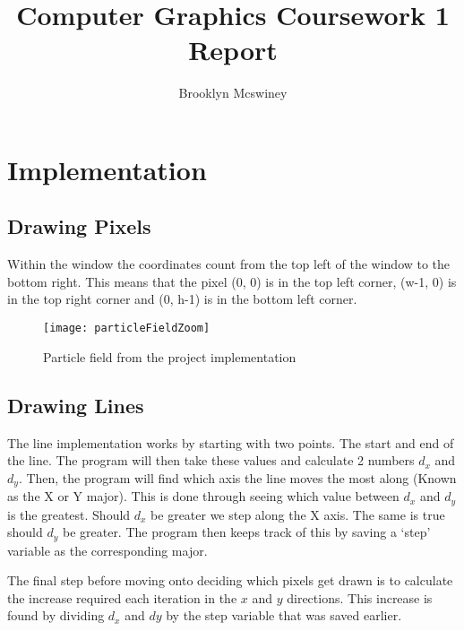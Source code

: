 \documentclass[
	letterpaper, %
	10pt, %
]{CSUniSchoolLabReport}
\title{Computer Graphics Coursework 1 Report} %
\author{Brooklyn Mcswiney} %
\date{ }
\begin{document}
\maketitle %

\noindent\makebox[\linewidth]{\rule{\paperwidth}{0.4pt}}

\tableofcontents

\pagebreak

\section{Implementation}

\subsection{Drawing Pixels}

Within the window the coordinates count from the top left of the window
to the bottom right. This means that the pixel (0, 0) is in the top left
corner, (w-1, 0) is in the top right corner and (0, h-1) is in the 
bottom left corner.

\begin{figure}[h]
	\centering
	\texttt{[image: particleFieldZoom]}
	\caption{Particle field from the project implementation}
\end{figure}

\subsection{Drawing Lines}
\begin{flushleft}
	The line implementation works by starting with two points. The start and
	end of the line. The program will then take these values and calculate 2
	numbers \(d_x\) and \( d_y\). Then, the program will find which axis the
	line moves the most along (Known as the X or Y major). This is done through
	seeing which value between \(d_x\) and \( d_y\) is the greatest. Should \(d_x\)
	be greater we step along the X axis. The same is true should \(d_y\) be greater.
	The program then keeps track of this by saving a `step' variable as the corresponding 
	major.
\end{flushleft}

\begin{flushleft}
	The final step before moving onto deciding which pixels get drawn is to calculate
	the increase required each iteration in the \(x\) and \(y\) directions.
	This increase is found by dividing \(d_x\) and \(dy\) by the step variable that was
	saved earlier. 
\end{flushleft}
\end{document}
